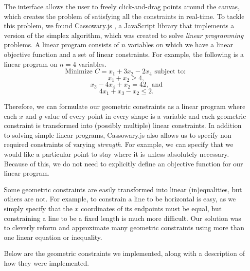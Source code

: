 The interface allows the user to freely click-and-drag points around the canvas, which creates the problem of satisfying all the constraints in real-time. To tackle this problem, we found Cassowary.js \cite{cassowary}, a JavaScript library that implements a version of the simplex algorithm, which was created to solve {\it linear programming} problems.  A linear program consists of $n$ variables on which we have a linear objective function and a set of linear constraints. For example, the following is a linear program on $n=4$ variables.
\[\text{Minimize } C = x_1 + 3x_2 - 2x_4 \text{ subject to: }\]
\[x_1 + x_2 \geq 4,\]
\[x_3 - 4x_4 + x_2 = 42, \text{ and}\]
\[4x_1 + x_3 - x_2 \leq 2.\]

Therefore, we can formulate our geometric constraints as a linear program where each $x$ and $y$ value of every point in every shape is a variable and each geometric constraint is transformed into (possibly multiple) linear constraints. In addition to solving simple linear programs, Cassowary.js also allows us to specify non-required constraints of varying {\it strength}. For example, we can specify that we would like a particular point to stay where it is unless absolutely necessary. Because of this, we do not need to explicitly define an objective function for our linear program.

Some geometric constraints are easily transformed into linear (in)equalities, but others are not. For example, to constrain a line to be horizontal is easy, as we simply specify that the $x$ coordinates of its endpoints must be equal, but constraining a line to be a fixed length is much more difficult. Our solution was to cleverly reform and approximate many geometric constraints using more than one linear equation or inequality.

Below are the geometric constraints we implemented, along with a description of how they were implemented. 


